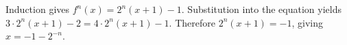 Induction gives $f^n(x)=2^n(x+1)-1$. Substitution into the equation yields $3\cdot2^n(x+1)-2=4\cdot2^n(x+1)-1$. Therefore $2^n(x+1)=-1$, giving $\boxed{x=-1-2^{-n}}$.
